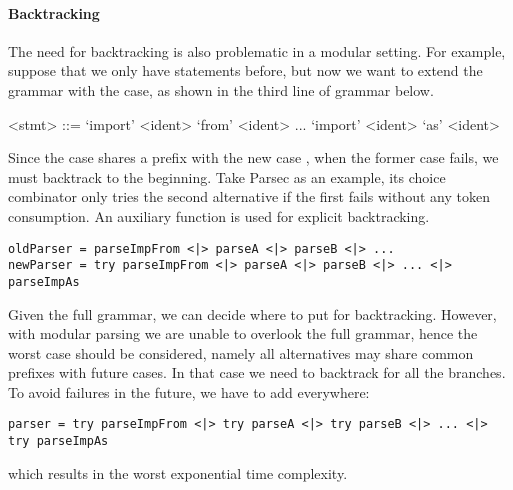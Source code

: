 \paragraph{Backtracking} The need for backtracking is also problematic
in a modular setting. For example, suppose that we only have  statements before,
but now we want to extend the grammar with the  case, as shown in the third line of grammar below.

\setlength{\grammarindent}{5em}
\begin{grammar}
<stmt> ::= `import' <ident> `from' <ident>
    \alt ...
    \alt `import' <ident> `as' <ident>
\end{grammar}

Since the  case shares a prefix with the new case , when the former case fails, we must backtrack to the beginning. Take Parsec as an example, its choice
combinator \inlinecode{<|>} only tries the second alternative if the first fails
without any token consumption. An auxiliary function  is used for explicit backtracking.

\begin{lstlisting}[language=PlainCode]
oldParser = parseImpFrom <|> parseA <|> parseB <|> ...
newParser = try parseImpFrom <|> parseA <|> parseB <|> ... <|> parseImpAs
\end{lstlisting}

Given the full grammar, we can decide where to put  for backtracking. However, with modular parsing we are unable to overlook the full grammar, hence the worst case should be considered, namely all alternatives may share common prefixes with future cases. In that case we need to backtrack for all the branches.
To avoid failures in the future, we have to add  everywhere:

\begin{lstlisting}[language=PlainCode]
parser = try parseImpFrom <|> try parseA <|> try parseB <|> ... <|> try parseImpAs
\end{lstlisting}
which results in the worst exponential time complexity.


